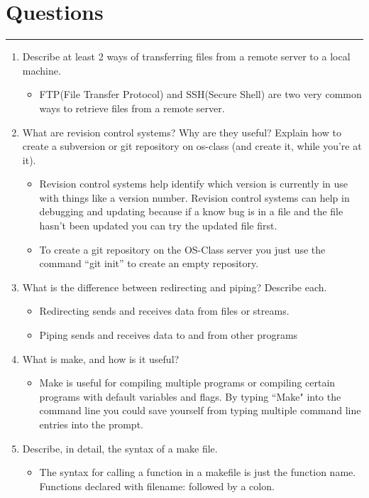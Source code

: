 \documentclass[letterpaper,10pt,titlepage,fleqn]{article}
\begin{document}
\section*{Questions}

\hrule

\begin{enumerate}
\item Describe at least 2 ways of transferring files from a remote server to a local machine.
\begin{itemize}
\item FTP(File Transfer Protocol) and SSH(Secure Shell) are two very common ways to retrieve files from a remote server.
\end{itemize}
\item What are revision control systems? Why are they useful? Explain how to create a subversion or git repository on os-class (and create it, while you're at it).
\begin{itemize}
\item Revision control systems help identify which version is currently in use with things like a version number. Revision control systems can help in debugging and updating because if a know bug is in a file and the file hasn’t been updated you can try the updated file first.
\item To create a git repository on the OS-Class server you just use the command ``git init” to create an empty repository.
\end{itemize}
\item What is the difference between redirecting and piping? Describe each.
\begin{itemize}
\item Redirecting sends and receives data from files or streams.
\item Piping sends and receives data to and from other programs
\end{itemize}
\item What is make, and how is it useful?
\begin{itemize}
\item Make is useful for compiling multiple programs or compiling certain programs with default variables and flags. By typing ``Make" into the command line you could save yourself from typing multiple command line entries into the prompt.
\end{itemize}
\item Describe, in detail, the syntax of a make file.
\begin{itemize}
\item The syntax for calling a function in a makefile is just the function name. Functions declared with \textlangle filename\textrangle : followed by a colon.\\

\end{itemize}
\end{enumerate}
\end{document}
